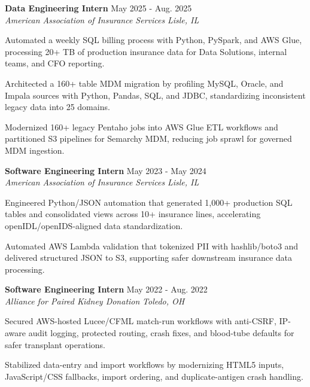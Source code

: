\documentclass[letterpaper,11pt]{article}
\newcommand{\resumeSubheading}[4]{
  \textbf{#1} \hfill #2\\
  \textit{#3} \hfill \textit{#4}
}
\begin{document}
\resumeSubheading
{Data Engineering Intern}{May 2025 - Aug. 2025}
{American Association of Insurance Services}{Lisle, IL}
\begin{tightitemize}
  \item Automated a weekly SQL billing process with Python, PySpark, and AWS Glue, processing 20+ TB of production insurance data for Data Solutions, internal teams, and CFO reporting.
  \item Architected a 160+ table MDM migration by profiling MySQL, Oracle, and Impala sources with Python, Pandas, SQL, and JDBC, standardizing inconsistent legacy data into 25 domains.
  \item Modernized 160+ legacy Pentaho jobs into AWS Glue ETL workflows and partitioned S3 pipelines for Semarchy MDM, reducing job sprawl for governed MDM ingestion.
\end{tightitemize}

\resumeSubheading
{Software Engineering Intern}{May 2023 - May 2024}
{American Association of Insurance Services}{Lisle, IL}
\begin{tightitemize}
  \item Engineered Python/JSON automation that generated 1,000+ production SQL tables and consolidated views across 10+ insurance lines, accelerating openIDL/openIDS-aligned data standardization.
  \item Automated AWS Lambda validation that tokenized PII with hashlib/boto3 and delivered structured JSON to S3, supporting safer downstream insurance data processing.
\end{tightitemize}

\resumeSubheading
{Software Engineering Intern}{May 2022 - Aug. 2022}
{Alliance for Paired Kidney Donation}{Toledo, OH}
\begin{tightitemize}
  \item Secured AWS-hosted Lucee/CFML match-run workflows with anti-CSRF, IP-aware audit logging, protected routing, crash fixes, and blood-tube defaults for safer transplant operations.
  \item Stabilized data-entry and import workflows by modernizing HTML5 inputs, JavaScript/CSS fallbacks, import ordering, and duplicate-antigen crash handling.
\end{tightitemize}
\end{document}
